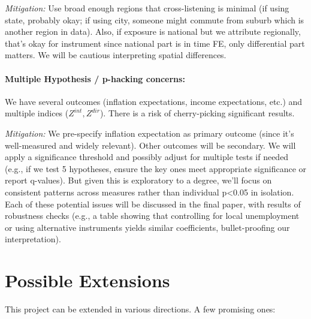 \documentclass[12pt]{article}
\begin{document}
\textit{Mitigation:} Use broad enough regions that cross-listening is minimal (if using state, probably okay; if using city, someone might commute from suburb which is another region in data). Also, if exposure is national but we attribute regionally, that's okay for instrument since national part is in time FE, only differential part matters. We will be cautious interpreting spatial differences.

\paragraph{Multiple Hypothesis / p-hacking concerns:} We have several outcomes (inflation expectations, income expectations, etc.) and multiple indices ($Z^{int}, Z^{dir}$). There is a risk of cherry-picking significant results.

\textit{Mitigation:} We pre-specify inflation expectation as primary outcome (since it's well-measured and widely relevant). Other outcomes will be secondary. We will apply a significance threshold and possibly adjust for multiple tests if needed (e.g., if we test 5 hypotheses, ensure the key ones meet appropriate significance or report q-values). But given this is exploratory to a degree, we'll focus on consistent patterns across measures rather than individual p<0.05 in isolation.
Each of these potential issues will be discussed in the final paper, with results of robustness checks (e.g., a table showing that controlling for local unemployment or using alternative instruments yields similar coefficients, bullet-proofing our interpretation).

\section{Possible Extensions}

This project can be extended in various directions. A few promising ones:
\end{document}
